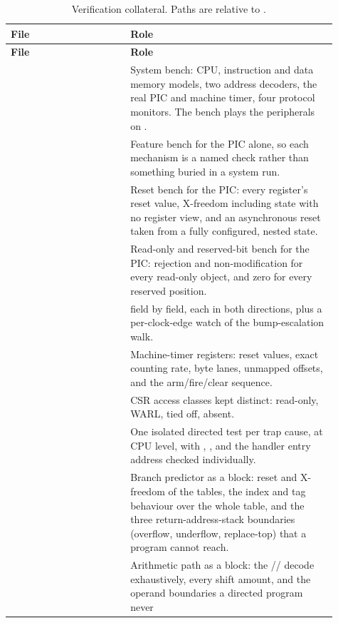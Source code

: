 {\small
\begin{longtable}{@{}L{0.33\linewidth}L{0.58\linewidth}@{}}
\caption{Verification collateral. Paths are relative to .}
\label{tab:collateral}\\
\toprule
\textbf{File} & \textbf{Role} \\
\midrule
\endfirsthead
\toprule
\textbf{File} & \textbf{Role} \\
\midrule
\endhead
\bottomrule
\endfoot
\bottomrule
\endlastfoot
{} & System bench: CPU, instruction and data memory models, two
  address decoders, the real PIC and machine timer, four protocol monitors. The bench plays the
  peripherals on . \\
 & Feature bench for the PIC alone, so each mechanism is a named check
  rather than something buried in a system run. \\
 & Reset bench for the PIC: every register's reset value, X-freedom
  including state with no register view, and an asynchronous reset taken from a fully configured,
  nested state. \\
 & Read-only and reserved-bit bench for the PIC: rejection and
  non-modification for every read-only object, and zero for every reserved position. \\
 &  field by field, each in both directions,
  plus a per-clock-edge watch of the bump-escalation walk. \\
 & Machine-timer registers: reset values, exact counting rate,
  byte lanes, unmapped offsets, and the arm/fire/clear sequence. \\
 & CSR access classes kept distinct: read-only, WARL, tied off,
  absent. \\
 & One isolated directed test per trap cause, at CPU level, with
  , ,  and the handler entry address checked individually. \\
 & Branch predictor as a block: reset and X-freedom of the tables, the
  index and tag behaviour over the whole table, and the three return-address-stack boundaries
  (overflow, underflow, replace-top) that a program cannot reach. \\
 & Arithmetic path as a block: the //
  decode exhaustively, every shift amount, and the operand boundaries a directed program never

\end{longtable}}
